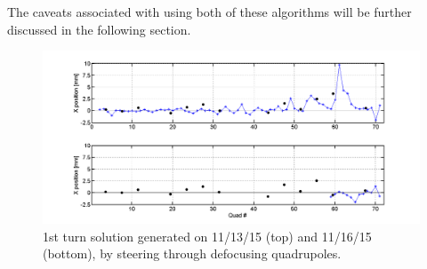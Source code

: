 The caveats associated with using both of these algorithms will be further discussed in the following section.



\begin{figure}[!h]
\includegraphics[width=\textwidth]{4.figures/quadscan_151113_151116.png}
\caption{1st turn solution generated on 11/13/15 (top) and 11/16/15 (bottom), by steering through defocusing quadrupoles.}
\label{fig:ring_steering}
\end{figure}


